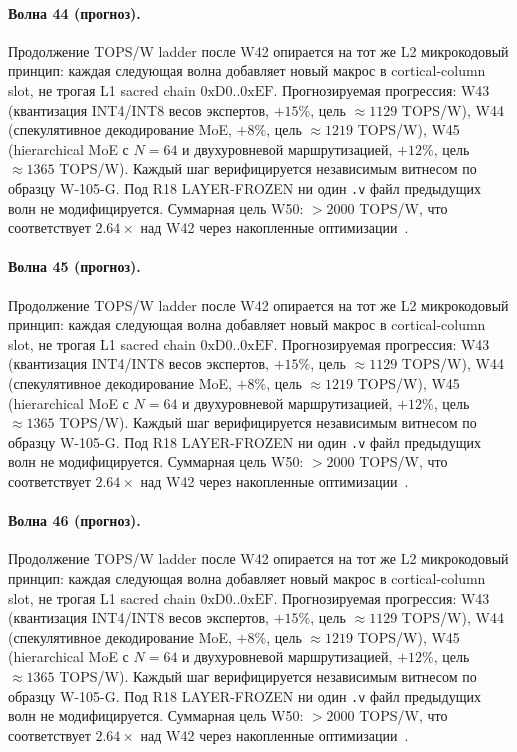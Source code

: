 \paragraph{Волна 44 (прогноз).} Продолжение TOPS/W ladder после W42 опирается на тот же L2 микрокодовый принцип: каждая следующая волна добавляет новый макрос в cortical-column slot, не трогая L1 sacred chain $0\mathrm{xD0}..0\mathrm{xEF}$. Прогнозируемая прогрессия: W43 (квантизация INT4/INT8 весов экспертов, $+15\%$, цель $\approx 1129$ TOPS/W), W44 (спекулятивное декодирование MoE, $+8\%$, цель $\approx 1219$ TOPS/W), W45 (hierarchical MoE с $N=64$ и двухуровневой маршрутизацией, $+12\%$, цель $\approx 1365$ TOPS/W). Каждый шаг верифицируется независимым витнесом по образцу W-105-G. Под R18 LAYER-FROZEN ни один \texttt{.v} файл предыдущих волн не модифицируется. Суммарная цель W50: $> 2000$ TOPS/W, что соответствует $2{.}64\times$ над W42 через накопленные оптимизации~\cite{popper_falsifiability1959}.

\paragraph{Волна 45 (прогноз).} Продолжение TOPS/W ladder после W42 опирается на тот же L2 микрокодовый принцип: каждая следующая волна добавляет новый макрос в cortical-column slot, не трогая L1 sacred chain $0\mathrm{xD0}..0\mathrm{xEF}$. Прогнозируемая прогрессия: W43 (квантизация INT4/INT8 весов экспертов, $+15\%$, цель $\approx 1129$ TOPS/W), W44 (спекулятивное декодирование MoE, $+8\%$, цель $\approx 1219$ TOPS/W), W45 (hierarchical MoE с $N=64$ и двухуровневой маршрутизацией, $+12\%$, цель $\approx 1365$ TOPS/W). Каждый шаг верифицируется независимым витнесом по образцу W-105-G. Под R18 LAYER-FROZEN ни один \texttt{.v} файл предыдущих волн не модифицируется. Суммарная цель W50: $> 2000$ TOPS/W, что соответствует $2{.}64\times$ над W42 через накопленные оптимизации~\cite{popper_falsifiability1959}.

\paragraph{Волна 46 (прогноз).} Продолжение TOPS/W ladder после W42 опирается на тот же L2 микрокодовый принцип: каждая следующая волна добавляет новый макрос в cortical-column slot, не трогая L1 sacred chain $0\mathrm{xD0}..0\mathrm{xEF}$. Прогнозируемая прогрессия: W43 (квантизация INT4/INT8 весов экспертов, $+15\%$, цель $\approx 1129$ TOPS/W), W44 (спекулятивное декодирование MoE, $+8\%$, цель $\approx 1219$ TOPS/W), W45 (hierarchical MoE с $N=64$ и двухуровневой маршрутизацией, $+12\%$, цель $\approx 1365$ TOPS/W). Каждый шаг верифицируется независимым витнесом по образцу W-105-G. Под R18 LAYER-FROZEN ни один \texttt{.v} файл предыдущих волн не модифицируется. Суммарная цель W50: $> 2000$ TOPS/W, что соответствует $2{.}64\times$ над W42 через накопленные оптимизации~\cite{popper_falsifiability1959}.

